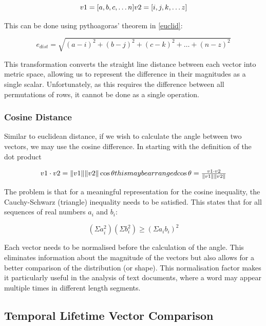   \begin{equation}
  v1 = [ a,b,c, \dots n ]
  $$$$
  v2 = [ i,j,k, \dots z ]
  \end{equation}

  This can be done using pythoagoras' theorem in \autoref{euclid}:

  \begin{equation}
  e_{dist}  = \sqrt{(a-i)^2 + (b-j)^2 + (c-k)^2 + \dots + (n-z)^2}
  \label{euclid}
  \end{equation}

  This transformation converts the straight line distance between each vector into metric space, allowing us to represent the difference in their magnitudes as a single scalar. Unfortunately, as this requires the difference between all permutations of rows, it cannot be done as a single operation.

  \subsubsection{Cosine Distance}\label{sec:cosine}
  Similar to euclidean distance, if we wish to calculate the angle between two vectors, we may use the cosine difference. In starting with the definition of the dot product

  \begin{equation}
  v1 \cdot v2 = \|v1\|\|v2\| \cos \theta
  $$this may be arranged$$
  \cos \theta = \frac{ v1 \cdot v2}{\|v1\|\|v2\|}
  \end{equation}

  The problem is that for a meaningful representation for the cosine inequality, the Cauchy-Schwarz (triangle) inequality needs to be satisfied. This states that for all sequences of real numbers $a_i$ and $b_i$:

  \begin{equation}
      (\Sigma a^2_i)(\Sigma b^2_i) \ge (\Sigma a_ib_i)^2
  \end{equation}

  Each vector needs to be normalised before the calculation of the angle. This eliminates information about the magnitude of the vectors but also allows for a better comparison of the distribution (or shape). This normalisation factor makes it particularly useful in the analysis of text documents, where a word may appear multiple times in different length segments.



  \subsection{Temporal Lifetime Vector Comparison}

